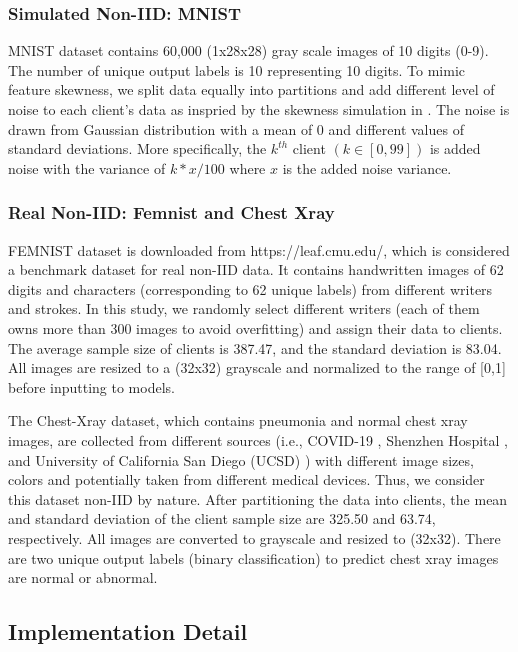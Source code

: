 \subsubsection{Simulated Non-IID: MNIST}
MNIST dataset \cite{deng2012mnist} contains 60,000 (1x28x28) gray scale images of 10 digits (0-9). The number of unique output labels is 10 representing 10 digits. To mimic feature skewness, we split data equally into \parties{} partitions and add different level of noise to each client's data as inspried by the skewness simulation in \cite{abs-2102-02079}. The noise is drawn from Gaussian distribution with a mean of 0 and different values of standard deviations. More specifically, the $k^{th}$ client $(k \in [0,99])$ is added noise with the variance of $k*x/100$ where $x$ is the added noise variance.  

\subsubsection{Real Non-IID: Femnist and Chest Xray}
FEMNIST dataset is downloaded from https://leaf.cmu.edu/, which is considered a benchmark dataset for real non-IID data. It contains handwritten images of 62 digits and characters (corresponding to 62 unique labels) from different writers and strokes. In this study, we randomly select \parties{} different writers (each of them owns more than 300 images to avoid overfitting) and assign their data to \parties{} clients. The average sample size of clients is 387.47, and the standard deviation is 83.04. All images are resized to a (32x32) grayscale and normalized to the range of [0,1] before inputting to models.

The Chest-Xray dataset, which contains pneumonia and normal chest xray images, are collected from different sources (i.e., COVID-19 \cite{covid19}, Shenzhen Hospital \cite{Shenzhen}, and University of California San Diego (UCSD) \cite{Kermany2018LabeledOC}) with different image sizes, colors and potentially taken from different medical devices. Thus, we consider this dataset non-IID by nature. After partitioning the data into \parties{} clients, the mean and standard deviation of the client sample size are 325.50 and 63.74, respectively. All images are converted to grayscale and resized to (32x32). There are two unique output labels (binary classification) to predict chest xray images are normal or abnormal.

\subsection{Implementation Detail}
